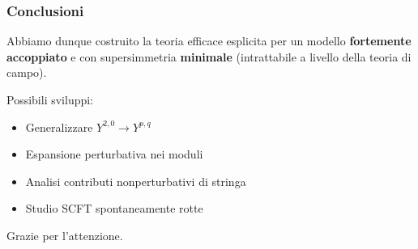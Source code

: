 \documentclass[aspectratio=43,mathserif]{beamer}
\begin{document}
\begin{frame}
	\begin{center}
		\frametitle{Conclusioni}
		
		Abbiamo dunque costruito la teoria efficace esplicita per un modello \textbf{fortemente accoppiato} e con supersimmetria \textbf{minimale} (intrattabile a livello della teoria di campo).
	\end{center}

		Possibili sviluppi:
\vfill
		\begin{itemize}
			\item Generalizzare $Y^{2,0} \rightarrow Y^{p,q}$
\vfill			\item Espansione perturbativa nei moduli
\vfill	\item Analisi contributi nonperturbativi di stringa
\vfill \item Studio SCFT spontaneamente rotte
		\end{itemize}
\vfill
	\begin{center}
		Grazie per l'attenzione.
	\end{center}
\end{frame}
\end{document}

